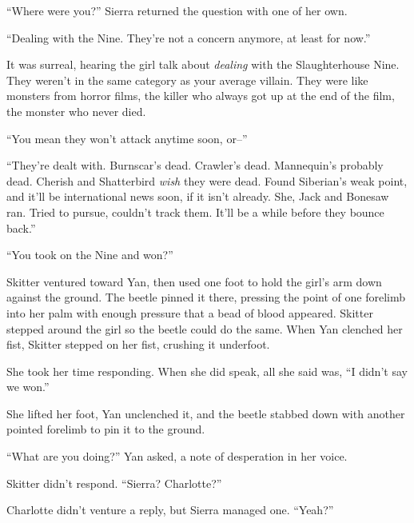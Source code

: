 ``Where were you?'' Sierra returned the question with one of her own.



``Dealing with the Nine.  They're not a concern anymore, at least for now.''



It was surreal, hearing the girl talk about \emph{dealing} with the Slaughterhouse Nine.  They weren't in the same category as your average villain.  They were like monsters from horror films, the killer who always got up at the end of the film, the monster who never died.



``You mean they won't attack anytime soon, or--''



``They're dealt with.  Burnscar's dead.  Crawler's dead.  Mannequin's probably dead.  Cherish and Shatterbird \emph{wish} they were dead.  Found Siberian's weak point, and it'll be international news soon, if it isn't already.  She, Jack and Bonesaw ran.  Tried to pursue, couldn't track them.  It'll be a while before they bounce back.''



``You took on the Nine and won?''



Skitter ventured toward Yan, then used one foot to hold the girl's arm down against the ground.  The beetle pinned it there, pressing the point of one forelimb into her palm with enough pressure that a bead of blood appeared.  Skitter stepped around the girl so the beetle could do the same.  When Yan clenched her fist, Skitter stepped on her fist, crushing it underfoot.



She took her time responding.  When she did speak, all she said was, ``I didn't say we won.''



She lifted her foot, Yan unclenched it, and the beetle stabbed down with another pointed forelimb to pin it to the ground.



``What are you doing?'' Yan asked, a note of desperation in her voice.



Skitter didn't respond.  ``Sierra?  Charlotte?''



Charlotte didn't venture a reply, but Sierra managed one.  ``Yeah?''



